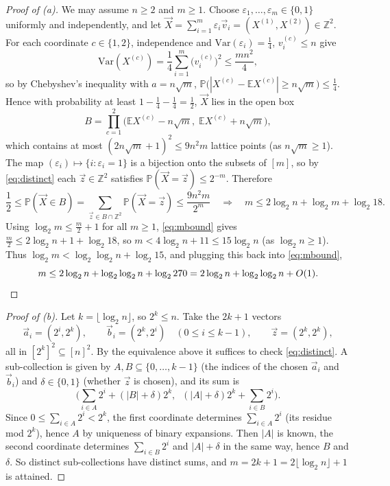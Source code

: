 \documentclass[a4paper,12pt]{article}
\newcommand{\eps}{\varepsilon}
\newcommand{\card}[1]{\left| #1 \right|}
\newcommand{\mb}[1]{\mathbb{#1}}
\begin{document}
\begin{proof}[Proof of (a)]
	We may assume $n \ge 2$ and $m \ge 1$. Choose $\eps_1, \hdots, \eps_m \in \{0,1\}$ uniformly and independently, and let $\vec X = \sum_{i=1}^m \eps_i \vec v_i = (X^{(1)}, X^{(2)}) \in \mb Z^2$. For each coordinate $c \in \{1, 2\}$, independence and $\mathrm{Var}(\eps_i) = \frac14$, $v_i^{(c)} \le n$ give
	\[
		\mathrm{Var}(X^{(c)}) = \frac14 \sum_{i=1}^m \big( v_i^{(c)} \big)^2 \le \frac{mn^2}{4},
	\]
	so by Chebyshev's inequality with $a = n\sqrt m$, $\mb P\big( \card{X^{(c)} - \mb E X^{(c)}} \ge n \sqrt m \big) \le \frac14$. Hence with probability at least $1 - \frac14 - \frac14 = \frac12$, $\vec X$ lies in the open box
	\[
		B = \prod_{c=1}^2 \big( \mb E X^{(c)} - n\sqrt m, \; \mb E X^{(c)} + n\sqrt m \big),
	\]
	which contains at most $(2n\sqrt m + 1)^2 \le 9 n^2 m$ lattice points (as $n \sqrt m \ge 1$). The map $(\eps_i) \mapsto \{ i : \eps_i = 1 \}$ is a bijection onto the subsets of $[m]$, so by \eqref{eq:distinct} each $\vec z \in \mb Z^2$ satisfies $\mb P(\vec X = \vec z) \le 2^{-m}$. Therefore
	\[
		\frac12 \le \mb P(\vec X \in B) = \sum_{\vec z \in B \cap \mb Z^2} \mb P(\vec X = \vec z) \le \frac{9 n^2 m}{2^m}
		\quad \Longrightarrow \quad
		m \le 2 \log_2 n + \log_2 m + \log_2 18. \tag{3} \label{eq:mbound}
	\]
	Using $\log_2 m \le \frac m2 + 1$ for all $m \ge 1$, \eqref{eq:mbound} gives $\frac m2 \le 2 \log_2 n + 1 + \log_2 18$, so $m < 4 \log_2 n + 11 \le 15 \log_2 n$ (as $\log_2 n \ge 1$). Thus $\log_2 m < \log_2 \log_2 n + \log_2 15$, and plugging this back into \eqref{eq:mbound},
	\[
		m \le 2 \log_2 n + \log_2 \log_2 n + \log_2 270 = 2 \log_2 n + \log_2 \log_2 n + O(1). \qedhere
	\]
\end{proof}

\begin{proof}[Proof of (b)]
	Let $k = \lfloor \log_2 n \rfloor$, so $2^k \le n$. Take the $2k + 1$ vectors
	\[
		\vec a_i = (2^i, 2^k), \qquad \vec b_i = (2^k, 2^i) \quad (0 \le i \le k-1), \qquad \vec z = (2^k, 2^k),
	\]
	all in $[2^k]^2 \subseteq [n]^2$. By the equivalence above it suffices to check \eqref{eq:distinct}. A sub-collection is given by $A, B \subseteq \{0, \hdots, k-1\}$ (the indices of the chosen $\vec a_i$ and $\vec b_i$) and $\delta \in \{0,1\}$ (whether $\vec z$ is chosen), and its sum is
	\[
		\Big( \sum_{i \in A} 2^i + (\card B + \delta) 2^k, \;\; (\card A + \delta) 2^k + \sum_{i \in B} 2^i \Big).
	\]
	Since $0 \le \sum_{i \in A} 2^i < 2^k$, the first coordinate determines $\sum_{i \in A} 2^i$ (its residue mod $2^k$), hence $A$ by uniqueness of binary expansions. Then $\card A$ is known, the second coordinate determines $\sum_{i \in B} 2^i$ and $\card A + \delta$ in the same way, hence $B$ and $\delta$. So distinct sub-collections have distinct sums, and $m = 2k + 1 = 2 \lfloor \log_2 n \rfloor + 1$ is attained.
\end{proof}
\end{document}
